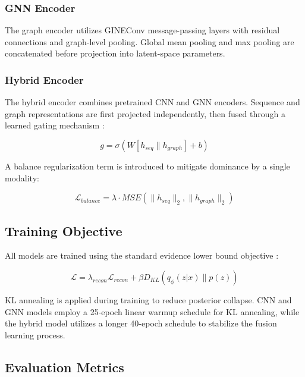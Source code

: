 \documentclass[conference]{IEEEtran}
\begin{document}
\subsubsection{GNN Encoder}

The graph encoder utilizes GINEConv message-passing layers \cite{gineconv_citation} with residual connections and graph-level pooling. Global mean pooling and max pooling are concatenated before projection into latent-space parameters.

\subsubsection{Hybrid Encoder}

The hybrid encoder combines pretrained CNN and GNN encoders. Sequence and graph representations are first projected independently, then fused through a learned gating mechanism \cite{gating_mechanism_citation}:

\begin{equation}
g = \sigma(W[h_{seq} \parallel h_{graph}] + b)
\end{equation}

A balance regularization term is introduced to mitigate dominance by a single modality:

\begin{equation}
\mathcal{L}_{balance} = \lambda \cdot MSE(\|h_{seq}\|_{2}, \|h_{graph}\|_{2})
\end{equation}

\subsection{Training Objective}

All models are trained using the standard evidence lower bound objective \cite{elbo_citation}:

\begin{equation}
\mathcal{L} = \lambda_{recon}\mathcal{L}_{recon} + \beta D_{KL}(q_{\phi}(z|x)\|p(z))
\end{equation}

KL annealing \cite{kl_annealing_citation} is applied during training to reduce posterior collapse. CNN and GNN models employ a 25-epoch linear warmup schedule for KL annealing, while the hybrid model utilizes a longer 40-epoch schedule to stabilize the fusion learning process.

\subsection{Evaluation Metrics}
\end{document}
